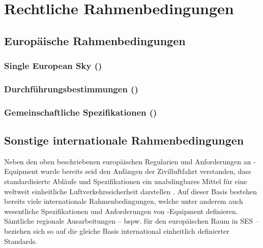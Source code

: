 \chapter{Rechtliche Rahmenbedingungen}

        
\section{Europäische Rahmenbedingungen}
\subsection{Single European Sky ()}
    \label{ch:er}
    
    
\subsection{Durchführungsbestimmungen ()}
    \label{ch:ir}
    
    \pagebreak

\subsection{Gemeinschaftliche Spezifikationen ()}
    \label{ch:cs}
    
    \pagebreak

\section{Sonstige internationale Rahmenbedingungen}
    
    Neben den oben beschriebenen europäischen Regularien und Anforderungen an \atmans-Equipment wurde bereits seid den Anfängen der Zivilluftfahrt verstanden, dass standardisierte Abläufe und Spezifikationen ein unabdingbares Mittel für eine weltweit einheitliche Luftverkehrssicherheit darstellen
    \cite[156]{eu_icao_milde}.
    Auf dieser Basis bestehen bereits viele internationale Rahmenbedingungen, welche unter anderem auch wesentliche Spezifikationen und Anforderungen von \atmans-Equipment definieren.
    Sämtliche regionale Ausarbeitungen -- bspw. für den europäischen Raum in \ac{SES} -- beziehen sich so auf die gleiche Basis international einheitlich definierter Standards.

